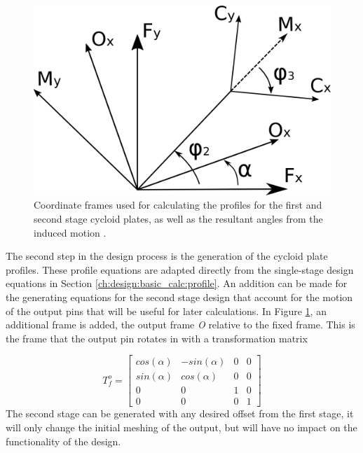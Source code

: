 \begin{figure}[h]
	\centering
	\includegraphics[width=0.50\linewidth]{fig/two_stage_frames}
   \caption{Coordinate frames used for calculating the profiles for the first and second stage cycloid plates, as well as the resultant angles from the induced motion \textalpha.}
   \label{fig:two_stage_frame}
\end{figure}

The second step in the design process is the generation of the cycloid plate profiles. These profile equations are adapted directly from the single-stage design equations in Section \ref{ch:design:basic_calc:profile}. An addition can be made for the generating equations for the second stage design that account for the motion of the output pins that will be useful for later calculations. In Figure \ref{fig:two_stage_frame}, an additional frame is added, the output frame \textit{O} relative to the fixed frame. This is the frame that the output pin rotates in with a transformation matrix 

\begin{equation} \label{eq:T_fo}
T_f^o = \left[{\begin{array}{cccc}
		cos(\alpha) & -sin(\alpha) & 0 & 0\\
		sin(\alpha) & cos(\alpha) & 0 & 0\\
		0 & 0 & 1 & 0\\
		0 & 0 & 0 & 1 \end{array} } \right]
\end{equation}
The second stage can be generated with any desired offset from the first stage, it will only change the initial meshing of the output, but will have no impact on the functionality of the design. 

